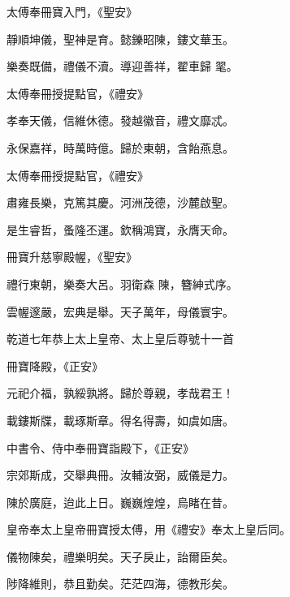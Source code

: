 \begin{pinyinscope}
 太傅奉冊寶入門，《聖安》



 靜順坤儀，聖神是育。懿鑠昭陳，鏤文華玉。



 樂奏既備，禮儀不瀆。導迎善祥，翟車歸
 毣。



 太傅奉冊授提點官，《禮安》



 孝奉天儀，信維休德。發越徽音，禮文靡忒。



 永保嘉祥，時萬時億。歸於東朝，含飴燕息。



 太傅奉冊授提點官，《禮安》



 肅雍長樂，克篤其慶。河洲茂德，沙麓啟聖。



 是生睿哲，蚤隆丕運。欽稱鴻寶，永膺天命。



 冊寶升慈寧殿幄，《聖安》



 禮行東朝，樂奏大呂。羽衛森
 陳，簪紳式序。



 雲幄邃嚴，宏典是舉。天子萬年，母儀寰宇。



 乾道七年恭上太上皇帝、太上皇后尊號十一首



 冊寶降殿，《正安》



 元祀介福，孰綏孰將。歸於尊親，孝哉君王！



 載鏤斯牒，載琢斯章。得名得壽，如虞如唐。



 中書令、侍中奉冊寶詣殿下，《正安》



 宗郊斯成，交舉典冊。汝輔汝弼，威儀是力。



 陳於廣庭，迨此上日。巍巍煌煌，烏睹在昔。



 皇帝奉太上皇帝冊寶授太傅，用《禮安》奉太上皇后同。



 儀物陳矣，禮樂明矣。天子戾止，詒爾臣矣。



 陟降維則，恭且勤矣。茫茫四海，德教形矣。




\end{pinyinscope}
